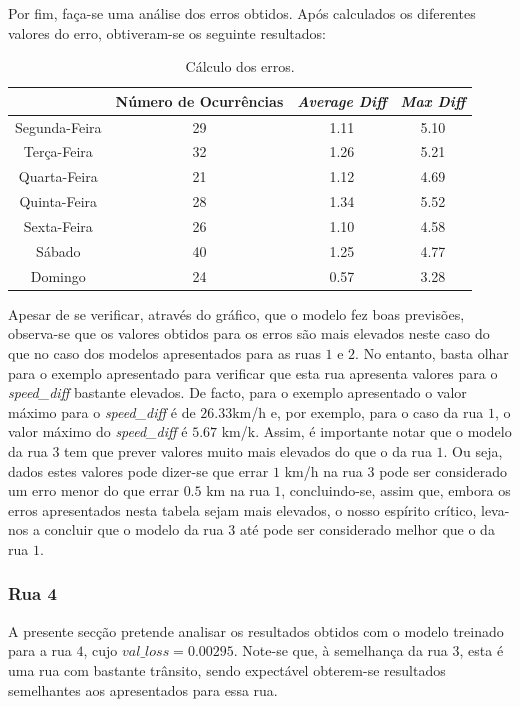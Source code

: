 \documentclass[a4paper, 12pt]{article}
\begin{document}
Por fim, faça-se uma análise dos erros obtidos. Após calculados os diferentes valores do erro, obtiveram-se os seguinte resultados:

\begin{table}[H]
	\centering
	\begin{tabular}{||c||c|c|c||}
		\hline\hline
		& Número de Ocurrências &\textit{Average Diff} & \textit{Max Diff} \\
		\hline\hline
		 Segunda-Feira & 29&
1.11
 & 5.10\\
		\hline
		 Terça-Feira  &32&

1.26 & 5.21 \\
		\hline
		 Quarta-Feira & 21&
1.12
 & 4.69 \\
		\hline
		 Quinta-Feira  & 28&
1.34
 & 5.52\\
		\hline
		 Sexta-Feira &26& 1.10
 & 4.58\\
		\hline
		 Sábado &40 & 
1.25& 4.77 \\
		\hline
		 Domingo & 24&
0.57
 & 
3.28 \\
		\hline\hline
	\end{tabular}
	\label{table:rua3}
	\caption{Cálculo dos erros.}
\end{table}

Apesar de se verificar, através do gráfico, que o modelo fez boas previsões, observa-se que os valores obtidos para os erros são mais elevados neste caso do que no caso dos modelos apresentados para as ruas $1$ e $2$. No entanto, basta olhar para o exemplo apresentado para verificar que esta rua apresenta valores para o \textit{speed\_diff} bastante elevados. De facto, para o exemplo apresentado o valor máximo para o \textit{speed\_diff} é de $26.33$km/h e, por exemplo, para o caso da rua $1$, o valor máximo do \textit{speed\_diff} é $5.67$ km/k. Assim, é importante notar que o modelo da rua $3$ tem que prever valores muito mais elevados do que o da rua $1$. Ou seja, dados estes valores pode dizer-se que errar $1$ km/h na rua $3$ pode ser considerado um erro menor do que errar $0.5$ km na rua $1$, concluindo-se, assim que, embora os erros apresentados nesta tabela sejam mais elevados, o nosso espírito crítico, leva-nos a concluir que o modelo da rua $3$ até pode ser considerado melhor que o da rua $1$.

\subsubsection{Rua 4}

A presente secção pretende analisar os resultados obtidos com o modelo treinado para a rua $4$, cujo $val\_loss=0.00295$. Note-se que, à semelhança da rua $3$, esta é uma rua com bastante trânsito, sendo expectável obterem-se resultados semelhantes aos apresentados para essa rua.
\end{document}
